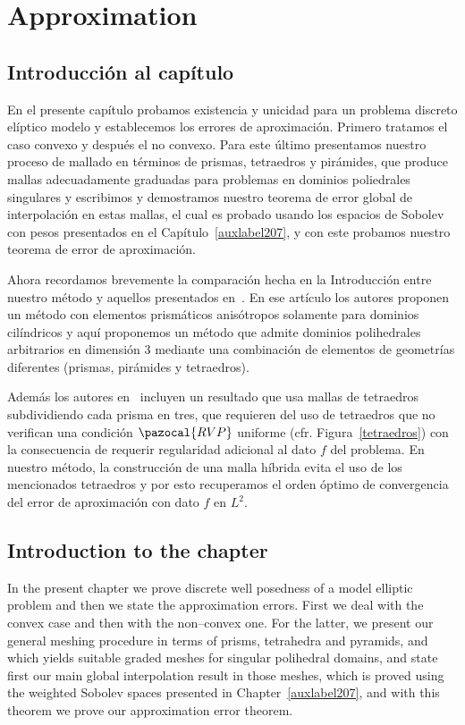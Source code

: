 \chapter{Approximation}\label{auxLabel100}
\section*{Introducci\'on al cap\'itulo}
En el presente cap\'itulo probamos existencia y unicidad
para un problema discreto el\'iptico modelo y establecemos
los errores de aproximaci\'on.
Primero tratamos el caso convexo y despu\'es el no convexo. 
Para este \'ultimo presentamos nuestro proceso de mallado
en t\'erminos de prismas, tetraedros y pir\'amides, que produce
mallas adecuadamente graduadas para problemas en dominios poliedrales singulares
y escribimos y demostramos nuestro teorema de error global de
interpolaci\'on en estas mallas, el cual es probado usando los espacios
de Sobolev con pesos presentados en el Cap\'itulo~\ref{auxlabel207},
y con este probamos nuestro teorema de error de aproximaci\'on.

Ahora recordamos brevemente la comparaci\'on hecha en
la Introducci\'on entre nuestro m\'etodo y 
aquellos presentados en~\cite{MR1866274}. En ese art\'iculo
los autores proponen un m\'etodo con elementos 
prism\'aticos anis\'otropos solamente para
dominios cil\'indricos y aqu\'i proponemos un m\'etodo
que admite dominios polihedrales arbitrarios en
dimensi\'on 3 mediante una combinaci\'on
de elementos de geometr\'ias diferentes (prismas,
pir\'amides y tetraedros).

Adem\'as los autores en~\cite{MR1866274} incluyen
un resultado que usa mallas de tetraedros subdividiendo
cada prisma en tres, que requieren del uso de
tetraedros que no verifican una condici\'on 
$\pazocal{RVP}$ uniforme (cfr. Figura~\ref{tetraedros})
con la consecuencia de requerir regularidad
adicional al dato $f$ del problema. En nuestro m\'etodo,
la construcci\'on de una malla
h\'ibrida evita el uso de los mencionados tetraedros
y por esto recuperamos el orden \'optimo de convergencia
del error de aproximaci\'on con dato $f$ en $L^2$.

\section*{Introduction to the chapter}
In the present chapter we prove
discrete well posedness of a model elliptic problem
and then we state the approximation errors.
First we deal with the convex case and then with the  non--convex
one. For the latter, we present our general meshing procedure
in terms of prisms, tetrahedra and pyramids, and which yields
suitable graded meshes for singular polihedral domains, 
and state first our main
global interpolation result in those meshes, which is proved using the 
weighted Sobolev spaces presented in Chapter~\ref{auxlabel207},
and with this theorem we prove our approximation error theorem.

